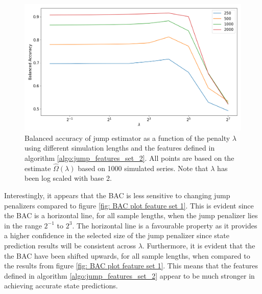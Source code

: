 \begin{figure}[H] 
    \centering
    \includegraphics[width=1\textwidth]{analysis/model_convergence/images/jump_penalties_feature_set_2.png}
    \caption{Balanced accuracy of jump estimator as a function of the penalty $\lambda$ using different simulation lengths and the features defined in algorithm \ref{algo:jump_features_set_2}. All points are based on the estimate $\hat{\Omega} (\lambda)$ based on 1000 simulated series. Note that $\lambda$ has been log scaled with base 2.}
    \label{fig: BAC plot feature set 2}
\end{figure}

Interestingly, it appears that the BAC is less sensitive to changing jump penalizers compared to figure \ref{fig: BAC plot feature set 1}. This is evident since the BAC is a horizontal line, for all sample lengths, when the jump penalizer lies in the range $2^{-1}$ to $2^3$. The horizontal line is a favourable property as it provides a higher confidence in the selected size of the jump penalizer since state prediction results will be consistent across $\lambda$. Furthermore, it is evident that the the BAC have been shifted upwards, for all sample lengths, when compared to the results from figure \ref{fig: BAC plot feature set 1}. This means that the features defined in algorithm \ref{algo:jump_features_set_2} appear to be much stronger in achieving accurate state predictions. 

